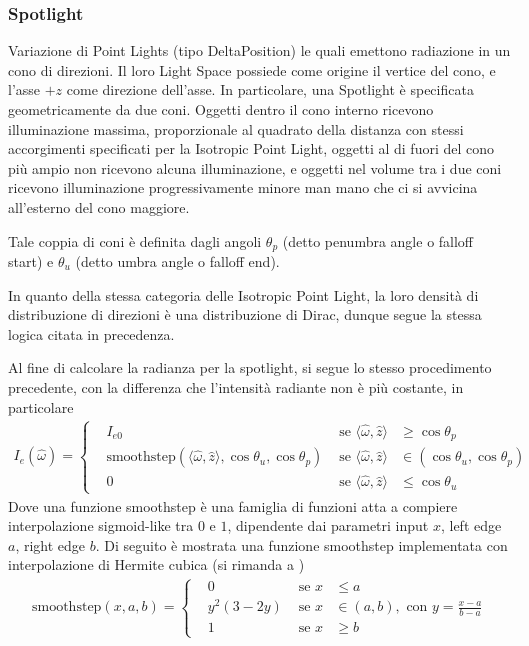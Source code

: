 \subsubsection{Spotlight}
Variazione di Point Lights (tipo DeltaPosition) le quali emettono radiazione in un cono di direzioni. Il loro Light Space possiede come origine il
vertice del cono, e l'asse $+z$ come direzione dell'asse. In particolare, una Spotlight \`e specificata geometricamente da due coni. Oggetti
dentro il cono interno ricevono illuminazione massima, proporzionale al quadrato della distanza con stessi accorgimenti specificati per la Isotropic
Point Light, oggetti al di fuori del cono pi\`u ampio non ricevono alcuna illuminazione, e oggetti nel volume tra i due coni ricevono illuminazione 
progressivamente minore man mano che ci si avvicina all'esterno del cono maggiore.\par
Tale coppia di coni \`e definita dagli angoli $\theta_p$ (detto penumbra angle o falloff start) e $\theta_u$ (detto umbra angle o falloff end).\par
In quanto della stessa categoria delle Isotropic Point Light, la loro densit\`a di distribuzione di direzioni \`e una distribuzione di Dirac, dunque
segue la stessa logica citata in precedenza.\par
Al fine di calcolare la radianza per la spotlight, si segue lo stesso procedimento precedente, con la differenza che l'intensit\`a radiante non \`e 
pi\`u costante, in particolare
\begin{align}
	I_e(\hat{\omega}) = \left\{\begin{aligned}
		&I_{e0} &\text{ se }\langle\hat{\omega},\hat{z}\rangle&\geq\cos\theta_p\\
		&\mathrm{smoothstep}(\langle\hat{\omega},\hat{z}\rangle,\cos\theta_u,\cos\theta_p)%
			&\text{ se }\langle\hat{\omega},\hat{z}\rangle&\in(\cos\theta_u,\cos\theta_p)\\
		&0 &\text{ se }\langle\hat{\omega},\hat{z}\rangle&\leq\cos\theta_u
	\end{aligned}\right.
\end{align}
Dove una funzione \textrm{smoothstep} \`e una famiglia di funzioni atta a compiere interpolazione sigmoid-like tra $0$ e $1$, dipendente dai 
parametri input $x$, left edge $a$, right edge $b$. Di seguito \`e mostrata una funzione \textrm{smoothstep} implementata con interpolazione di 
Hermite cubica (si rimanda a \cite{pegoraro})
\begin{align}
	\mathrm{smoothstep}(x,a,b)=\left\{\begin{aligned}
		&0 &\text{ se }x&\leq a\\
		&y^2(3-2y) &\text{ se }x&\in(a,b),\text{ con }y=\frac{x-a}{b-a}\\
		&1 &\text{ se }x&\geq b
	\end{aligned}\right.
\end{align}
